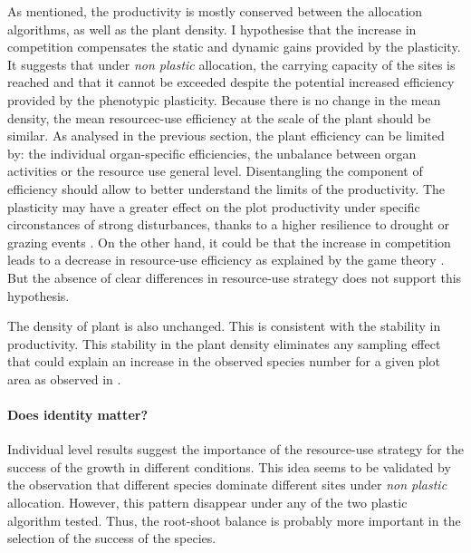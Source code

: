 As mentioned, the productivity is mostly conserved between the allocation algorithms, as well as the plant density. I hypothesise that the increase in competition compensates the static and dynamic gains provided by the plasticity. It suggests that under \textit{non plastic} allocation, the carrying capacity of the sites is reached and that it cannot be exceeded despite the potential increased efficiency provided by the phenotypic plasticity. Because there is no change in the mean density, the mean resourcec-use efficiency at the scale of the plant should be similar. As analysed in the previous section, the plant efficiency can be limited by: the individual organ-specific efficiencies, the unbalance between organ activities or the resource use general level.  Disentangling the component of efficiency should allow to better understand the limits of the productivity. The plasticity may have a greater effect on the plot productivity under specific circonstances of strong disturbances, thanks to a higher resilience to drought or grazing events \cite{maire_plasticity_2013}. On the other hand, it could be that the increase in competition leads to a decrease in resource-use efficiency as explained by the game theory \parencite{farrior_competitive_2014}. But the absence of clear differences in resource-use strategy does not support this hypothesis.

The density of plant is also unchanged. This is consistent with the stability in productivity. This stability in the plant density eliminates any sampling effect that could explain an increase in the observed species number for a given plot area as observed in \cite{lepik_high_2005}.

\paragraph{Does identity matter?}

Individual level results suggest the importance of the resource-use strategy for the success of the growth in different conditions. This idea seems to be validated by the observation that different species dominate different sites under \textit{non plastic} allocation. However, this pattern disappear under any of the two plastic algorithm tested. Thus, the root-shoot balance is probably more important in the selection of the success of the species.

